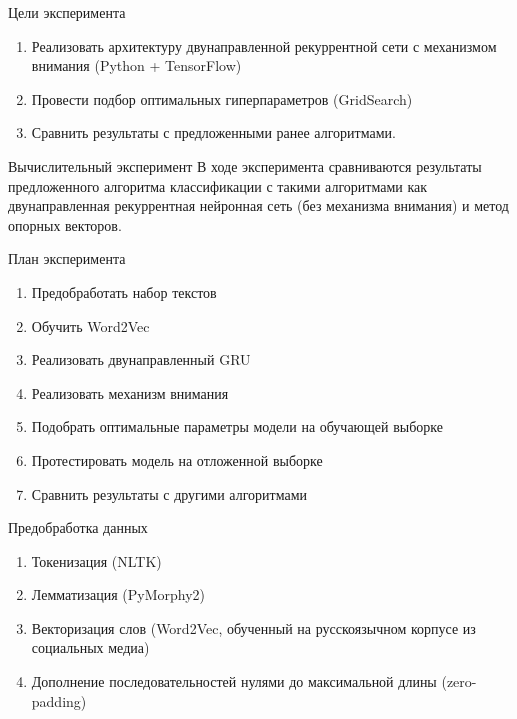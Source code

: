 \documentclass{beamer}
\begin{document}
\begin{frame}{Цели эксперимента}
	\begin{enumerate}
		\item Реализовать архитектуру двунаправленной рекуррентной сети с механизмом внимания (Python + TensorFlow)
		\item Провести подбор оптимальных гиперпараметров (GridSearch)
		\item Сравнить результаты с предложенными ранее алгоритмами.
	\end{enumerate}
\end{frame}
\begin{frame}{Вычислительный эксперимент}
В ходе эксперимента сравниваются результаты предложенного алгоритма классификации с такими алгоритмами как двунаправленная рекуррентная нейронная сеть (без механизма внимания) и метод опорных векторов. \\
\begin{block}{План эксперимента}
	\begin{enumerate}
		\item Предобработать набор текстов
		\item Обучить Word2Vec
		\item Реализовать двунаправленный GRU
		\item Реализовать механизм внимания
		\item Подобрать оптимальные параметры модели на обучающей выборке
		\item Протестировать модель на отложенной выборке
		\item Сравнить результаты с другими алгоритмами
	\end{enumerate}
\end{block}
\end{frame}
\begin{frame}{Предобработка данных}

\begin{enumerate}
	\item Токенизация (NLTK)
	\item Лемматизация (PyMorphy2)
	\item Векторизация слов (Word2Vec, обученный на русскоязычном корпусе из социальных медиа)
	\item Дополнение последовательностей нулями до максимальной длины (zero-padding)
	
\end{enumerate}
\end{frame}
\end{document}
